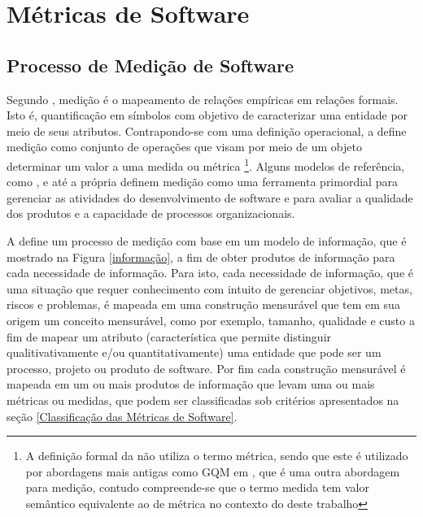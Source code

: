 \chapter{Métricas de Software}

\section{Processo de Medição de Software}

Segundo , medição é o mapeamento de relações empíricas em relações formais. Isto é, quantificação em símbolos com objetivo de caracterizar uma entidade por meio de seus atributos. Contrapondo-se com uma  definição operacional, a  define medição como conjunto de operações que visam por meio de um objeto determinar um valor a uma medida ou métrica \footnote{A definição formal da  não utiliza o termo métrica, sendo que este é utilizado por abordagens mais antigas como GQM em , que é uma outra abordagem para medição, contudo compreende-se que o termo medida tem valor semântico equivalente ao de métrica no contexto do deste trabalho}. Alguns modelos de referência, como , e até a própria  definem medição como uma ferramenta primordial para gerenciar as atividades do desenvolvimento de software e para avaliar a qualidade dos produtos e a capacidade de processos organizacionais. 


A  define um processo de medição com base em um modelo de
informação, que é mostrado na Figura \ref{informação}, a fim de obter produtos de informação para cada necessidade de informação. Para isto, cada necessidade de informação, que é uma situação que requer conhecimento com intuito de  gerenciar objetivos, metas, riscos e problemas, é mapeada em uma construção  mensurável que tem em sua origem um conceito mensurável, como por exemplo,  tamanho, qualidade e custo a fim de mapear um atributo (característica  que permite distinguir qualitivativamente e/ou quantitativamente) uma entidade que pode ser um processo, projeto ou produto de software. Por fim  cada construção mensurável é mapeada em um ou mais produtos de informação que  levam uma ou mais métricas ou medidas, que podem ser classificadas sob  critérios apresentados na seção \ref{Classificação das Métricas de Software}.

